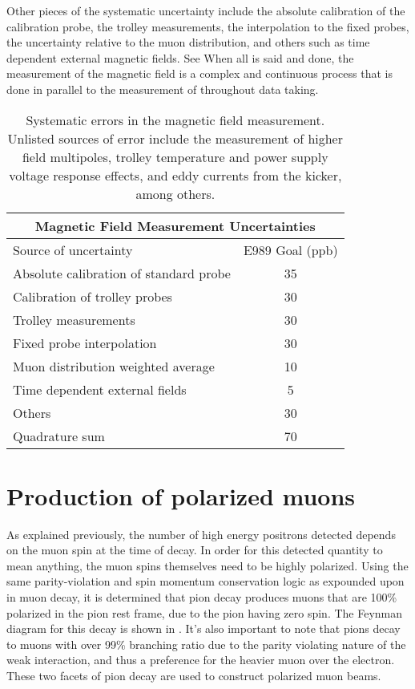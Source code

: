 Other pieces of the systematic uncertainty include the absolute calibration of the calibration probe, the trolley measurements, the interpolation to the fixed probes, the uncertainty relative to the muon distribution, and others such as time dependent external magnetic fields. See  When all is said and done, the measurement of the magnetic field is a complex and continuous process that is done in parallel to the measurement of \wa throughout data taking. 


\begin{table}[]
\centering
\setlength\tabcolsep{10pt}
\renewcommand{\arraystretch}{1.2}
\begin{tabular*}{.8\linewidth}{@{\extracolsep{\fill}}lc}
  \hline
    \multicolumn{2}{c}{\textbf{Magnetic Field Measurement Uncertainties}} \\
  \hline\hline
    Source of uncertainty & E989 Goal (ppb) \\
  \hline
    Absolute calibration of standard probe & 35 \\
    Calibration of trolley probes & 30 \\
    Trolley measurements & 30 \\
    Fixed probe interpolation & 30 \\
    Muon distribution weighted average & 10 \\
    Time dependent external fields & 5 \\
    Others & 30 \\
  \hline
    Quadrature sum & 70 \\
  \hline 
\end{tabular*}
\caption[Uncertainties in the magnetic field measurement]{Systematic errors in the magnetic field measurement. Unlisted sources of error include the measurement of higher field multipoles, trolley temperature and power supply voltage response effects, and eddy currents from the kicker, among others.}
\label{tab:magneticfielduncertainties}
\end{table}



\section{Production of polarized muons}
\label{sec:Accelerator}

As explained previously, the number of high energy positrons detected depends on the muon spin at the time of decay. In order for this detected quantity to mean anything, the muon spins themselves need to be highly polarized. Using the same parity-violation and spin momentum conservation logic as expounded upon in muon decay, it is determined that pion decay produces muons that are 100\% polarized in the pion rest frame, due to the pion having zero spin. The Feynman diagram for this decay is shown in . It's also important to note that pions decay to muons with over 99\% branching ratio due to the parity violating nature of the weak interaction, and thus a preference for the heavier muon over the electron. These two facets of pion decay are used to construct polarized muon beams. 

